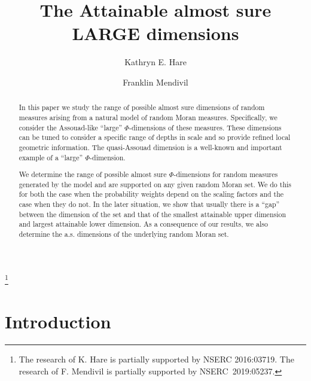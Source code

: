 \documentclass{amsart}
\theoremstyle{plain}
\numberwithin{equation}{section}
\begin{document}
\title[]{The Attainable almost sure LARGE dimensions}
\author{Kathryn E. Hare}
\address{Dept. of Pure Mathematics, University of Waterloo, Waterloo, Ont.,
Canada, N2L 3G1}
\author{Franklin Mendivil}
\address{Department of Mathematics and Statistics, Acadia University,
Wolfville, N.S. Canada, B4P 2R6}
\thanks{The research of K. Hare is partially supported by NSERC 2016:03719.
The research of F. Mendivil is partially supported by NSERC\ 2019:05237.}

\begin{abstract}
In this paper we study the range of possible almost sure dimensions of random measures arising from a natural model
of random Moran measures.
Specifically, we consider the Assouad-like ``large'' $\Phi$-dimensions of these measures.
These dimensions can be tuned to consider a specific range of depths in scale and so provide refined local geometric
information.
The quasi-Assouad dimension is a well-known and important example of a ``large'' $\Phi$-dimension.

We determine the range of possible almost sure $\Phi$-dimensions for random measures  generated by the model and are supported on any given random Moran set.
We do this for both the case when the probability weights depend on the scaling factors and the case when they do not.
In the later situation, we show that usually there is a ``gap'' between the dimension of the set and that of the  smallest attainable upper dimension and largest attainable lower dimension.
As a consequence of our results, we also determine the a.s. dimensions of the underlying random Moran set.

\end{abstract}

\maketitle





\section{Introduction}
\end{document}
